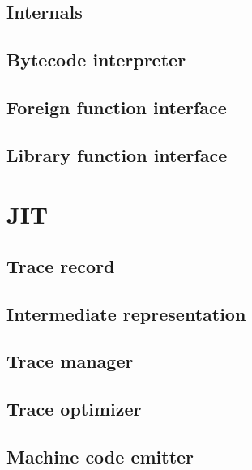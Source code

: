 \documentclass[12pt, oneside]{Thesis}
\begin{document}
  \chapter{Internals}
  \label{Chapt:Internals}
  

  \chapter{Bytecode interpreter}
  \label{Chapt:BI}
  

  \chapter{Foreign function interface}
  \label{Chapt:FFI}
  

  \chapter{Library function interface}
  \label{Chapt:LFI}

\part{JIT}
\label{Part:JIT}

  \chapter{Trace record}
  \label{Chapt:TR}
  

  \chapter{Intermediate representation}
  \label{Chapt:IR}
  

  \chapter{Trace manager}
  \label{Chapt:TM}
  

  \chapter{Trace optimizer}
  \label{Chapt:TO}
  

  \chapter{Machine code emitter}
  \label{Chapt:mcode}
\clearpage
{}
\appendix
\baselineskip=16pt
\end{document}
